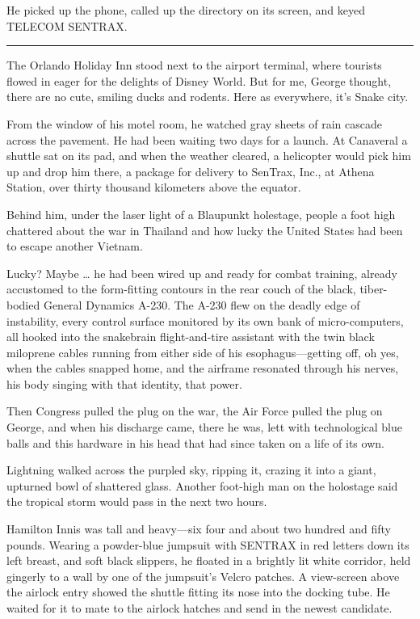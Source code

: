 He picked up the phone, called up the directory on its screen, and keyed TELECOM SENTRAX.

\fancybreak{* * *}

The Orlando Holiday Inn stood next to the airport terminal, where tourists flowed in eager for the delights of Disney World. But for me, George thought, there are no cute, smiling ducks and rodents. Here as everywhere, it’s Snake city.

From the window of his motel room, he watched gray sheets of rain cascade across the pavement. He had been waiting two days for a launch. At Canaveral a shuttle sat on its pad, and when the weather cleared, a helicopter would pick him up and drop him there, a package for delivery to SenTrax, Inc., at Athena Station, over thirty thousand kilometers above the equator.

Behind him, under the laser light of a Blaupunkt holestage, people a foot high chattered about the war in Thailand and how lucky the United States had been to escape another Vietnam.

Lucky? Maybe … he had been wired up and ready for combat training, already accustomed to the form-fitting contours in the rear couch of the black, tiber-bodied General Dynamics A-230. The A-230 flew on the deadly edge of instability, every control surface monitored by its own bank of micro-computers, all hooked into the snakebrain flight-and-tire assistant with the twin black miloprene cables running from either side of his esophagus—getting off, oh yes, when the cables snapped home, and the airframe resonated through his nerves, his body singing with that identity, that power.

Then Congress pulled the plug on the war, the Air Force pulled the plug on George, and when his discharge came, there he was, lett with technological blue balls and this hardware in his head that had since taken on a life of its own.

Lightning walked across the purpled sky, ripping it, crazing it into a giant, upturned bowl of shattered glass. Another foot-high man on the holostage said the tropical storm would pass in the next two hours.

Hamilton Innis was tall and heavy—six four and about two hundred and fifty pounds. Wearing a powder-blue jumpsuit with SENTRAX in red letters down its left breast, and soft black slippers, he floated in a brightly lit white corridor, held gingerly to a wall by one of the jumpsuit’s Velcro patches. A view-screen above the airlock entry showed the shuttle fitting its nose into the docking tube. He waited for it to mate to the airlock hatches and send in the newest candidate.

